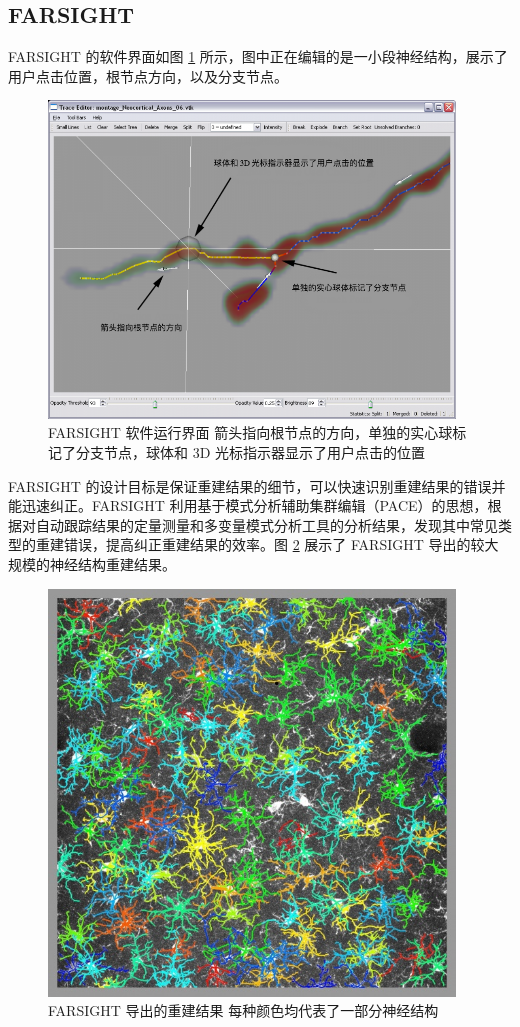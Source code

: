 \subsection{FARSIGHT}
FARSIGHT 的软件界面如图 \ref{FARSIGHT} 所示，图中正在编辑的是一小段神经结构，展示了用户点击位置，根节点方向，以及分支节点。
\begin{figure}
\centering
\includegraphics[width=108mm]{images/FARSIGHT}
\caption{FARSIGHT 软件运行界面 箭头指向根节点的方向，单独的实心球标记了分支节点，球体和 3D 光标指示器显示了用户点击的位置}
\label{FARSIGHT}
\end{figure}

FARSIGHT 的设计目标是保证重建结果的细节，可以快速识别重建结果的错误并能迅速纠正。FARSIGHT 利用基于模式分析辅助集群编辑（PACE）的思想，根据对自动跟踪结果的定量测量和多变量模式分析工具的分析结果，发现其中常见类型的重建错误，提高纠正重建结果的效率。图 \ref{FARSIGHT-res} 展示了 FARSIGHT 导出的较大规模的神经结构重建结果。

\begin{figure}
\centering
\includegraphics[width=108mm]{images/FARSIGHT-res}
\caption{FARSIGHT 导出的重建结果 每种颜色均代表了一部分神经结构}
\label{FARSIGHT-res}
\end{figure}

